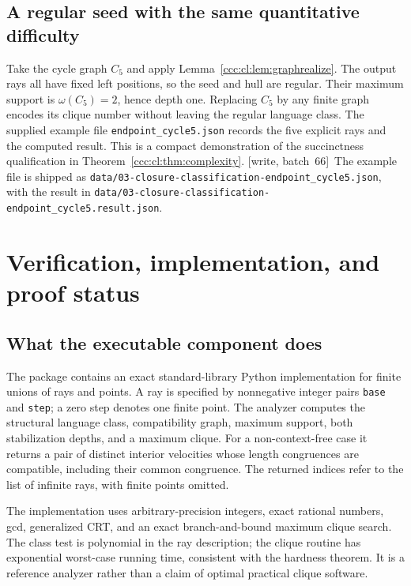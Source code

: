 \documentclass[11pt,letterpaper]{article}
\theoremstyle{definition}
\theoremstyle{remark}
\newcommand{\wsix}{\textup{[write, batch~66]}}
\begin{document}
\subsection{A regular seed with the same quantitative difficulty}

Take the cycle graph $C_5$ and apply Lemma~\ref{ccc:cl:lem:graphrealize}.
The output rays all have fixed left positions, so the seed and hull are
regular. Their maximum support is $\omega(C_5)=2$, hence depth one.
Replacing $C_5$ by any finite graph encodes its clique number without
leaving the regular language class. The supplied example file
\texttt{endpoint\_cycle5.json} records the five explicit rays and the
computed result. This is a compact demonstration of the succinctness
qualification in Theorem~\ref{ccc:cl:thm:complexity}.
\wsix\ The example file is shipped as
\nolinkurl{data/03-closure-classification-endpoint_cycle5.json}, with the
result in \nolinkurl{data/03-closure-classification-endpoint_cycle5.result.json}.

\section{Verification, implementation, and proof status}\label{ccc:cl:sec:verification}

\subsection{What the executable component does}

The package contains an exact standard-library Python implementation for
finite unions of rays and points. A ray is specified by nonnegative
integer pairs \texttt{base} and \texttt{step}; a zero step denotes one
finite point. The analyzer computes the structural language class,
compatibility graph, maximum support, both stabilization depths, and a
maximum clique. For a non-context-free case it returns a pair of distinct
interior velocities whose length congruences are compatible,
including their common congruence. The returned indices refer to the
list of infinite rays, with finite points omitted.

The implementation uses arbitrary-precision integers, exact rational
numbers, gcd, generalized CRT, and an exact branch-and-bound maximum
clique search. The class test is polynomial in the ray description;
the clique routine has exponential worst-case running time, consistent
with the hardness theorem. It is a reference analyzer rather than a
claim of optimal practical clique software.
\end{document}
